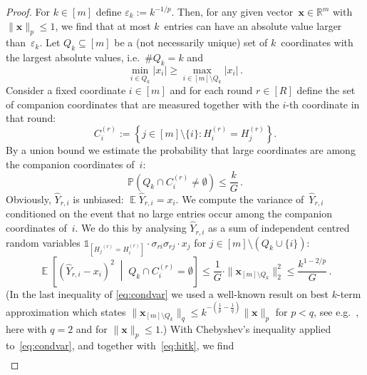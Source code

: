 \documentclass[12pt]{article}
\theoremstyle{plain}
\theoremstyle{definition}
\renewcommand{\P}{{\mathbb P}}
\newcommand{\expect}{\operatorname{\mathbb{E}}}
\newcommand{\ind}{\mathds{1}}
\newcommand{\eps}{\varepsilon}
\renewcommand{\vec}{\boldsymbol}
\newcommand{\R}{{\mathbb R}}
\begin{document}
\begin{proof}
    For $k \in [m]$ define $\eps_k := k^{-1/p}$.
    Then, for any given vector~$\vec{x} \in \R^m$ with $\|\vec{x}\|_p \leq 1$,
    we find that at most $k$~entries can have an absolute value larger than~$\eps_k$.
    Let $Q_k \subseteq [m]$ be a (not necessarily unique) set of $k$~coordinates with the largest absolute values, i.e.~$\#Q_k = k$ and
    \begin{equation*}
        \min_{i \in Q_k} |x_i| \geq \max_{i \in [m]\setminus Q_k} |x_i| \,.
    \end{equation*}
    Consider a fixed coordinate $i \in [m]$ and for each round $r \in [R]$ define the set of companion coordinates that are measured together with the $i$-th coordinate in that round:
    \begin{equation*}
        C_i^{(r)} := \left\{ j \in [m] \setminus \{i\} \colon H_i^{(r)} = H_j^{(r)} \right\} .
    \end{equation*}
    By a union bound we estimate the probability that large coordinates are among the companion coordinates of~$i$:
    \begin{equation} \label{eq:hitk}
        \P\left( Q_k \cap C_i^{(r)} \neq \emptyset\right) \leq \frac{k}{G} \,.
    \end{equation}
    Obviously, $\hat{Y}_{r,i}$ is unbiased:
    $\expect \hat{Y}_{r,i} = x_i$.
    We compute the variance of~$\hat{Y}_{r,i}$ conditioned on the event that no large entries occur among the companion coordinates of~$i$.
    We do this by analysing $\hat{Y}_{r,i}$ as a sum of independent centred random variables
    \mbox{$\ind_{[{H_j}^{(r)} = H_i^{(r)}]} \cdot \sigma_{ri}\sigma_{rj} \cdot x_j$}
    for \mbox{$j \in [m] \setminus (Q_k \cup \{i\})$}:
    \begin{equation} \label{eq:condvar}
        \expect\left[\left(\hat{Y}_{r,i} - x_i\right)^2 \;\middle|\; Q_k \cap C_i^{(r)} = \emptyset \right]
            \leq \frac{1}{G}  \cdot \|\vec{x}_{[m] \setminus Q_k}\|_2^2
            \leq \frac{k^{1-2/p}}{G} \,.
    \end{equation}
    (In the last inequality of \eqref{eq:condvar} we used
    a well-known result on best $k$-term approximation which states
    $\|\vec{x}_{[m] \setminus Q_k}\|_q \leq k^{-\left(\frac{1}{p}-\frac{1}{q}\right)} \|\vec{x}\|_p$ for $p < q$,
    see e.g.~\cite[eq~(2.6)]{CDD09},
    here with $q=2$ and for $\|\vec{x}\|_p \leq 1$.)
    With Chebyshev's inequality applied to~\eqref{eq:condvar}, and together with~\eqref{eq:hitk}, we find
    \begin{align*}

\end{align*}
\end{proof}
\end{document}
